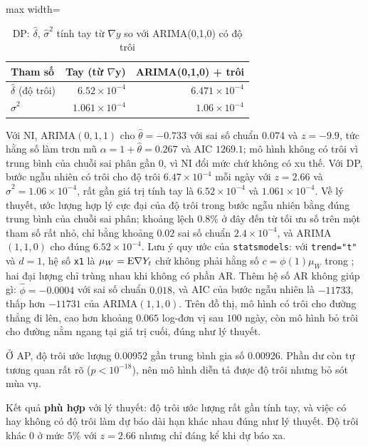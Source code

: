 \begin{table}[H]
\centering\footnotesize
\caption{DP: $\hat\delta$, $\hat\sigma^2$ tính tay từ $\nabla y$ so với ARIMA(0,1,0) có độ trôi}\label{tab:tab_b12_05_rw_manual_vs_arima}
\begin{adjustbox}{max width=\linewidth}
\begin{tabular}{|l|r|r|}
\toprule
Tham số & Tay (từ $\nabla$y) & ARIMA(0,1,0) + trôi \\
\midrule
$\hat{\delta}$ (độ trôi) & $6.52\times10^{-4}$ & $6.471\times10^{-4}$ \\
$\hat{\sigma}^{2}$ & $1.061\times10^{-4}$ & $1.06\times10^{-4}$ \\
\bottomrule
\end{tabular}
\end{adjustbox}
\end{table}
 Với NI, ARIMA$(0,1,1)$ cho $\hat\theta=-0.733$ với sai số chuẩn $0.074$ và $z=-9.9$, tức hằng số làm trơn mũ $\alpha=1+\hat\theta=0.267$ và AIC $1269.1$; mô hình không có trôi vì trung bình của chuỗi sai phân gần $0$, vì NI đổi mức chứ không có xu thế. Với DP, bước ngẫu nhiên có trôi cho độ trôi $6.47\times10^{-4}$ mỗi ngày với $z=2.66$ và $\hat\sigma^2=1.06\times10^{-4}$, rất gần giá trị tính tay là $6.52\times10^{-4}$ và $1.061\times10^{-4}$. Về lý thuyết, ước lượng hợp lý cực đại của độ trôi trong bước ngẫu nhiên bằng đúng trung bình của chuỗi sai phân; khoảng lệch $0.8\%$ ở đây đến từ tối ưu số trên một tham số rất nhỏ, chỉ bằng khoảng $0.02$ sai số chuẩn $2.4\times10^{-4}$, và ARIMA$(1,1,0)$ cho đúng $6.52\times10^{-4}$. Lưu ý quy ước của \texttt{statsmodels}: với \texttt{trend="t"} và $d=1$, hệ số \texttt{x1} là $\mu_W=\mathrm{E}\nabla Y_t$ chứ không phải hằng số $c=\phi(1)\mu_W$ trong ; hai đại lượng chỉ trùng nhau khi không có phần AR. Thêm hệ số AR không giúp gì: $\hat\phi=-0.0004$ với sai số chuẩn $0.018$, và AIC của bước ngẫu nhiên là $-11733$, thấp hơn $-11731$ của ARIMA$(1,1,0)$. Trên đồ thị, mô hình có trôi cho đường thẳng đi lên, cao hơn khoảng $0.065$ log-đơn vị sau $100$ ngày, còn mô hình bỏ trôi cho đường nằm ngang tại giá trị cuối, đúng như lý thuyết.

Ở AP, độ trôi ước lượng 0.00952 gần trung bình gia số 0.00926. Phần dư còn tự tương quan rất rõ ($p<10^{-18}$), nên mô hình diễn tả được độ trôi nhưng bỏ sót mùa vụ.

 Kết quả \textbf{phù hợp} với lý thuyết: độ trôi ước lượng rất gần tính tay, và việc có hay không có độ trôi làm dự báo dài hạn khác nhau đúng như lý thuyết. Độ trôi khác $0$ ở mức $5\%$ với $z=2.66$ nhưng chỉ đáng kể khi dự báo xa.

